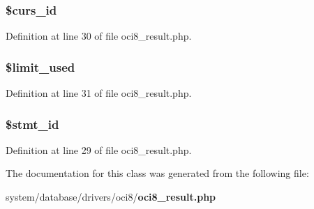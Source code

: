 \subsubsection[{\$curs\-\_\-id}]{\setlength{\rightskip}{0pt plus 5cm}\$curs\-\_\-id}\label{class_c_i___d_b__oci8__result_a75e7d18ad2e68ace3813533c9da2e179}


Definition at line 30 of file oci8\-\_\-result.\-php.

\subsubsection[{\$limit\-\_\-used}]{\setlength{\rightskip}{0pt plus 5cm}\$limit\-\_\-used}\label{class_c_i___d_b__oci8__result_a96df35d7e3e76bef21ebb80234fe59e8}


Definition at line 31 of file oci8\-\_\-result.\-php.

\subsubsection[{\$stmt\-\_\-id}]{\setlength{\rightskip}{0pt plus 5cm}\$stmt\-\_\-id}\label{class_c_i___d_b__oci8__result_a1a97f17fd259cd27c73b65e6c3706ec0}


Definition at line 29 of file oci8\-\_\-result.\-php.



The documentation for this class was generated from the following file\-:\begin{DoxyCompactItemize}
\item 
system/database/drivers/oci8/{\bf oci8\-\_\-result.\-php}\end{DoxyCompactItemize}
